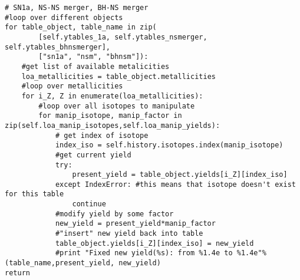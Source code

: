 \begin{lstlisting}[style=custompython, caption={Some caption}]
# SN1a, NS-NS merger, BH-NS merger
#loop over different objects
for table_object, table_name in zip(
        [self.ytables_1a, self.ytables_nsmerger, self.ytables_bhnsmerger],
        ["sn1a", "nsm", "bhnsm"]):
    #get list of available metalicities
    loa_metallicities = table_object.metallicities
    #loop over metallicities
    for i_Z, Z in enumerate(loa_metallicities):
        #loop over all isotopes to manipulate
        for manip_isotope, manip_factor in zip(self.loa_manip_isotopes,self.loa_manip_yields):
            # get index of isotope
            index_iso = self.history.isotopes.index(manip_isotope)
            #get current yield
            try:
                present_yield = table_object.yields[i_Z][index_iso]
            except IndexError: #this means that isotope doesn't exist for this table
                continue
            #modify yield by some factor
            new_yield = present_yield*manip_factor
            #"insert" new yield back into table
            table_object.yields[i_Z][index_iso] = new_yield
            #print "Fixed new yield(%s): from %1.4e to %1.4e"%(table_name,present_yield, new_yield)
return
\end{lstlisting}

